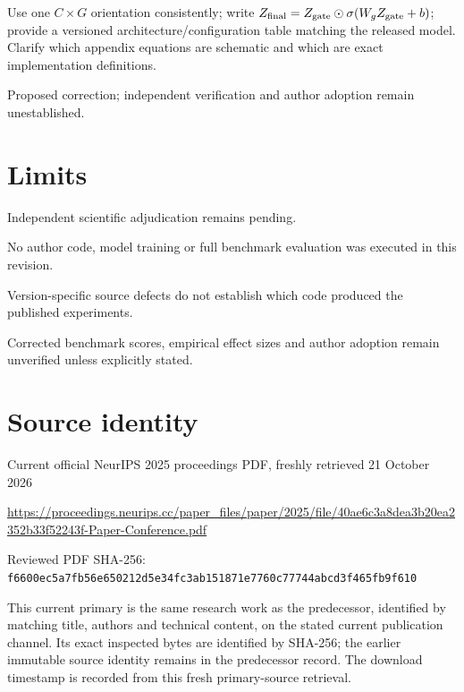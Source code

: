 \documentclass[11pt]{article}
\begin{document}
Use one \(C\times G\) orientation consistently; write \(Z_{\rm final}=Z_{\rm gate}\odot\sigma(W_gZ_{\rm gate}+b)\); provide a versioned architecture/configuration table matching the released model. Clarify which appendix equations are schematic and which are exact implementation definitions.

Proposed correction; independent verification and author adoption remain unestablished.

\section*{Limits}

Independent scientific adjudication remains pending.\par

No author code, model training or full benchmark evaluation was executed in this revision.\par

Version-specific source defects do not establish which code produced the published experiments.\par

Corrected benchmark scores, empirical effect sizes and author adoption remain unverified unless explicitly stated.\par

\section*{Source identity}

Current official NeurIPS 2025 proceedings PDF, freshly retrieved 21 October 2026

\url{https://proceedings.neurips.cc/paper_files/paper/2025/file/40ae6c3a8dea3b20ea2352b33f52243f-Paper-Conference.pdf}

Reviewed PDF SHA-256: \nolinkurl{f6600ec5a7fb56e650212d5e34fc3ab151871e7760c77744abcd3f465fb9f610}

This current primary is the same research work as the predecessor, identified by matching title, authors and technical content, on the stated current publication channel. Its exact inspected bytes are identified by SHA-256; the earlier immutable source identity remains in the predecessor record. The download timestamp is recorded from this fresh primary-source retrieval.
\end{document}
